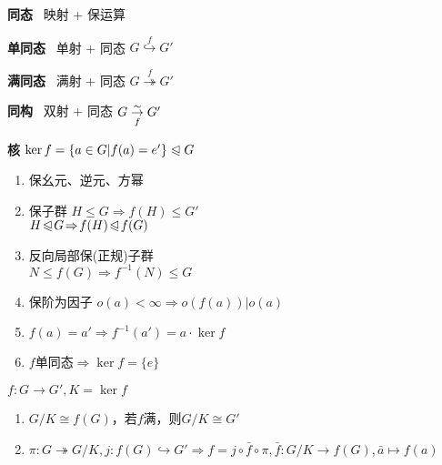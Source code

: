 \documentclass[a4paper,10pt]{ctexart}
\newcommand*{\impl}{\Rightarrow}
\renewcommand*{\leq}{\leqslant}
\newcommand*{\nmsubgroupeq}{\trianglelefteqslant}
\begin{document}
\begin{multicols}{3}
    \textbf{同态} \ 映射 + 保运算

    \textbf{单同态} \ 单射 + 同态 $G \overset{f}{\hookrightarrow} G'$

    \textbf{满同态} \ 满射 + 同态 $G \overset{f}{\twoheadrightarrow} G'$

    \textbf{同构} \ 双射 + 同态 $G \overunderset{\sim}{f}{\rightarrow} G'$

    \textbf{核} $\ker f = \{ a \in G | f(a) = e' \} \nmsubgroupeq G$

    \begin{theorem}[同态性质]
        \hfil

        \begin{enumerate}
            \item 保幺元、逆元、方幂
            \item 保子群 $H \leq G \impl f(H) \leq G'$\\
                  $H \!\nmsubgroupeq\! G \!\impl\! f(H) \!\nmsubgroupeq\! f(G)$
            \item 反向局部保(正规)子群 \\
                  $N \!\leq\! f(G) \!\impl\! f^{-1}(N) \!\leq\! G$
            \item 保阶为因子 $o(a) \!<\! \infty \!\impl\! o(f(a)) | o(a)$
            \item $f(a) = a' \impl f^{-1}(a') = a \cdot \ker f$
            \item $f$单同态$\impl \ker f = \{e\}$
        \end{enumerate}
    \end{theorem}

    \begin{theorem}[同态基本定理]
        $f: G \rightarrow G', K = \ker f$

        \begin{enumerate}
            \item $G/K \cong f(G)$，若$f$满，则$G/K \cong G'$
            \item $\pi: G \twoheadrightarrow G/K, j: f(G) \hookrightarrow G' \impl f = j \circ \bar{f} \circ \pi, \bar{f}: G/K \rightarrow f(G), \bar{a} \mapsto f(a)$
        \end{enumerate}

    \end{theorem}


\end{multicols}
\end{document}
